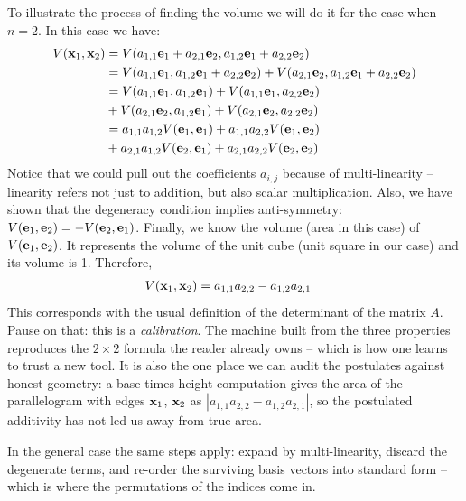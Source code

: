 \documentclass{article}
\begin{document}
To illustrate the process of finding the volume we will do it for the case
when $n=2$.
In this case we have:
\begin{align*}
  V({\bf x}_1, {\bf x}_2)
  &= V(a_{1,1} {\bf e}_1 + a_{2, 1} {\bf e}_2, a_{1, 2}{\bf e}_1 + a_{2, 2}{\bf e}_2) \\
  &= V(a_{1,1} {\bf e}_1, a_{1, 2}{\bf e}_1 + a_{2, 2}{\bf e}_2)
        + V(a_{2,1} {\bf e}_2, a_{1, 2}{\bf e}_1 + a_{2, 2}{\bf e}_2) \\
  &= V(a_{1,1} {\bf e}_1, a_{1,2}{\bf e}_1) + V(a_{1,1} {\bf e}_1, a_{2,2} {\bf e}_2) \\
  &+ V(a_{2,1} {\bf e}_2, a_{1,2}{\bf e}_1) + V(a_{2,1} {\bf e}_2, a_{2,2} {\bf e}_2) \\
  &= a_{1,1} a_{1,2} V({\bf e}_1, {\bf e}_1) + a_{1,1}a_{2,2} V({\bf e}_1, {\bf e}_2) \\
  &+ a_{2,1} a_{1,2} V({\bf e}_2, {\bf e}_1) + a_{2,1} a_{2,2} V({\bf e}_2, {\bf e}_2)
\end{align*} 
Notice that we could pull out the coefficients $a_{i,j}$
because of multi-linearity -- linearity
refers not just to addition, but also scalar multiplication. 
Also, we have shown that the degeneracy condition implies anti-symmetry:
$V({\bf e}_1, {\bf e}_2) = - V({\bf e}_2, {\bf e}_1)$.
Finally, we know the volume (area in this case) of $V({\bf e}_1, {\bf e}_2)$. It
represents the volume of the unit cube (unit square in our case) and its volume is 1.
Therefore,
\begin{align}
  V({\bf x}_1, {\bf x}_2) &= a_{1,1} a_{2,2} - a_{1,2} a_{2,1}
\end{align}
This corresponds with the usual definition of the determinant of the matrix $A$.
Pause on that: this is a {\em calibration\/}. The machine built from the three
properties reproduces the $2 \times 2$ formula the reader already owns -- which
is how one learns to trust a new tool. It is also the one place we can audit the
postulates against honest geometry: a base-times-height computation gives the
area of the parallelogram with edges ${\bf x}_1$, ${\bf x}_2$ as
$|a_{1,1} a_{2,2} - a_{1,2} a_{2,1}|$, so the postulated additivity has not led
us away from true area.

In the general case the same steps apply: expand by multi-linearity, discard
the degenerate terms, and re-order the surviving basis vectors into standard
form -- which is where the permutations of the indices come in.
\end{document}
